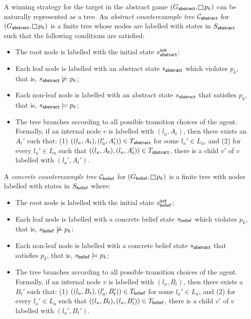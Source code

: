 A winning strategy for the target in the abstract game $(G_\abstr,\LTLglobally p_k)$ can be naturally represented as a tree. 
An \emph{abstract counterexample tree} $\mathcal{C}_{\mathsf{abstract}}$ for $(G_\abstr,\LTLglobally p_k)$ is a finite tree  whose nodes are labelled with states in $S_{\mathsf{abstract}}$ such that the following conditions are satisfied:
\begin{itemize}
\item The root node is labelled with the initial state $s_{\mathsf{abstract}}^{\mathsf{init}}$;
\item Each leaf node is labelled with an abstract state $s_{\mathsf{abstract}}$ which violates $p_k$, that is, $s_{\mathsf{abstract}} \not\models p_k$;
\item Each non-leaf node is labelled with an abstract state $s_{\mathsf{abstract}}$ that satisfies $p_k$, that is, $s_{\mathsf{abstract}} \models p_k$; 
\item The tree branches according to all possible transition choices of the agent. Formally, if an internal node $v$ is labelled with $(l_a,A_t)$, then there exists an $A_t'$  such that: (1) $((l_a,A_t),(l_a',A_t')) \in T_{\mathsf{abstract}}$ for some $l_a' \in L_a$, and (2) for every $l_a' \in L_a$ such that $((l_a,A_t),(l_a,A_t')) \in T_{\mathsf{abstract}}$, there is a child $v'$ of $v$ labelled with $(l_a',A_t')$.
\end{itemize}

A \emph{concrete counterexample tree} $\mathcal{C}_{\mathsf{belief}}$ for $(G_\belief,\LTLglobally p_k)$ is a finite tree with nodes labelled with states in $S_{\mathsf{belief}}$ where:
\begin{itemize}
\item The root node is labelled with the initial state $s_{\mathsf{belief}}^{\mathsf{init}}$;
\item Each leaf node is labelled with a concrete belief state $s_{\mathsf{belief}}$ which violates $p_k$, that is, $s_{\mathsf{belief}} \not\models p_k$;
\item Each non-leaf node is labelled with a concrete belief state $s_{\mathsf{abstract}}$ that satisfies $p_k$, that is, $s_{\mathsf{belief}} \models p_k$; 
\item The tree branches according to all possible transition choices of the agent. Formally, if an internal node $v$ is labelled with $(l_a,B_t)$, then there exists a $B_t'$  such that: (1) $((l_a,B_t),(l_a',B_t')) \in T_{\mathsf{belief}}$ for some $l_a' \in L_a$, and (2) for every $l_a' \in L_a$ such that $((l_a,B_t),(l_a,B_t')) \in T_{\mathsf{belief}}$, there is a child $v'$ of $v$ labelled with $(l_a',B_t')$.
\end{itemize}

